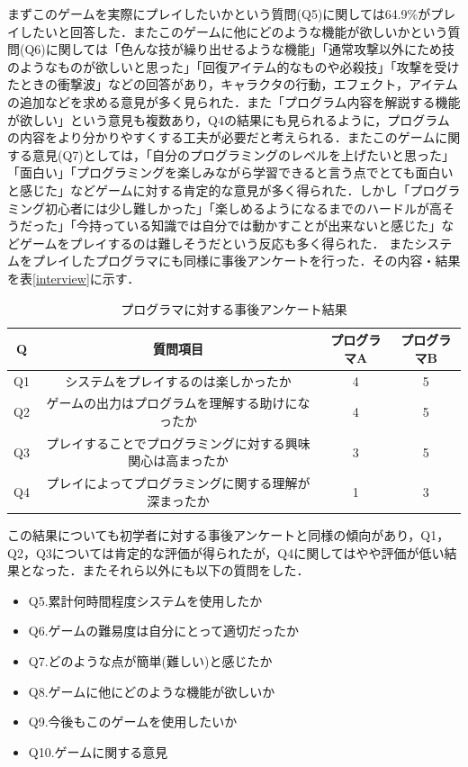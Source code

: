 \begin{enumerate}
  まずこのゲームを実際にプレイしたいかという質問(Q5)に関しては64.9\%がプレイしたいと回答した．またこのゲームに他にどのような機能が欲しいかという質問(Q6)に関しては「色んな技が繰り出せるような機能」「通常攻撃以外にため技のようなものが欲しいと思った」「回復アイテム的なものや必殺技」「攻撃を受けたときの衝撃波」などの回答があり，キャラクタの行動，エフェクト，アイテムの追加などを求める意見が多く見られた．また「プログラム内容を解説する機能が欲しい」という意見も複数あり，Q4の結果にも見られるように，プログラムの内容をより分かりやすくする工夫が必要だと考えられる．またこのゲームに関する意見(Q7)としては，「自分のプログラミングのレベルを上げたいと思った」「面白い」「プログラミングを楽しみながら学習できると言う点でとても面白いと感じた」などゲームに対する肯定的な意見が多く得られた．しかし「プログラミング初心者には少し難しかった」「楽しめるようになるまでのハードルが高そうだった」「今持っている知識では自分では動かすことが出来ないと感じた」などゲームをプレイするのは難しそうだという反応も多く得られた．
  またシステムをプレイしたプログラマにも同様に事後アンケートを行った．その内容・結果を表\ref{interview}に示す．

  \begin{table}[h]
    \centering
    \caption{プログラマに対する事後アンケート結果}
    \label{programmer_interview}
      \begin{tabular}{|c|c|c|c|} \hline
        Q & 質問項目 & プログラマA & プログラマB \\ \hline
        Q1 & システムをプレイするのは楽しかったか & 4 & 5 \\ \hline
        Q2 & ゲームの出力はプログラムを理解する助けになったか & 4 & 5\\ \hline
        Q3 & プレイすることでプログラミングに対する興味関心は高まったか & 3 & 5\\ \hline
        Q4 & プレイによってプログラミングに関する理解が深まったか & 1 & 3\\ \hline
      \end{tabular}
  \end{table}
  この結果についても初学者に対する事後アンケートと同様の傾向があり，Q1，Q2，Q3については肯定的な評価が得られたが，Q4に関してはやや評価が低い結果となった．またそれら以外にも以下の質問をした．

  \begin{itemize}
    \item Q5.累計何時間程度システムを使用したか
    \item Q6.ゲームの難易度は自分にとって適切だったか
    \item Q7.どのような点が簡単(難しい)と感じたか
    \item Q8.ゲームに他にどのような機能が欲しいか
    \item Q9.今後もこのゲームを使用したいか
    \item Q10.ゲームに関する意見
  \end{itemize}


\end{enumerate}
